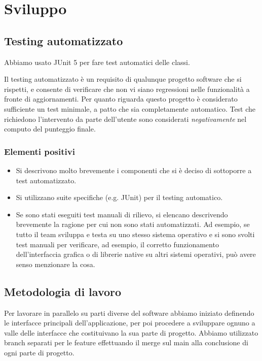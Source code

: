 \documentclass[a4paper,12pt]{report}
\begin{document}
\chapter{Sviluppo}
\section{Testing automatizzato}

Abbiamo usato JUnit 5 per fare test automatici delle classi.

Il testing automatizzato è un requisito di qualunque progetto software che si rispetti, e consente di verificare che non vi siano regressioni nelle funzionalità a fronte di aggiornamenti.
%
Per quanto riguarda questo progetto è considerato sufficiente un test minimale, a patto che sia completamente automatico.
%
Test che richiedono l'intervento da parte dell'utente sono considerati \textit{negativamente} nel computo del punteggio finale.

\subsection*{Elementi positivi}

\begin{itemize}
	\item Si descrivono molto brevemente i componenti che si è deciso di sottoporre a test automatizzato.
	\item Si utilizzano suite specifiche (e.g. JUnit) per il testing automatico.
	\item Se sono stati eseguiti test manuali di rilievo, si elencano descrivendo brevemente la ragione per cui non sono stati automatizzati. Ad esempio, se tutto il team sviluppa e testa su uno stesso sistema operativo e si sono svolti test manuali per verificare, ad esempio, il corretto funzionamento dell'interfaccia grafica o di librerie native su altri sistemi operativi, può avere senso menzionare la cosa.
\end{itemize}

\section{Metodologia di lavoro}

Per lavorare in parallelo su parti diverse del software abbiamo iniziato definendo le interfacce principali dell'applicazione, per poi procedere a sviluppare ognuno a valle delle interfacce che costituivano la sua
parte di progetto. Abbiamo utilizzato branch separati per le feature effettuando il merge sul main alla conclusione di ogni parte di progetto.
\end{document}
